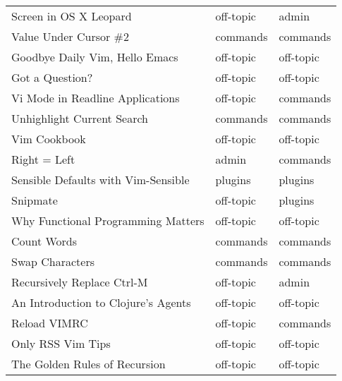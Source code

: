 \begin{tabular}{lll}
 Screen in OS X Leopard                      & off-topic   & admin     \\
 Value Under Cursor \#2                       & commands    & commands  \\
 Goodbye Daily Vim, Hello Emacs              & off-topic   & off-topic \\
 Got a Question?                             & off-topic   & off-topic \\
 Vi Mode in Readline Applications            & off-topic   & commands  \\
 Unhighlight Current Search                  & commands    & commands  \\
 Vim Cookbook                                & off-topic   & off-topic \\
 Right = Left                                & admin       & commands  \\
 Sensible Defaults with Vim-Sensible         & plugins     & plugins   \\
 Snipmate                                    & off-topic   & plugins   \\
 Why Functional Programming Matters          & off-topic   & off-topic \\
 Count Words                                 & commands    & commands  \\
 Swap Characters                             & commands    & commands  \\
 Recursively Replace Ctrl-M                  & off-topic   & admin     \\
 An Introduction to Clojure's Agents         & off-topic   & off-topic \\
 Reload VIMRC                                & off-topic   & commands  \\
 Only RSS Vim Tips                           & off-topic   & off-topic \\
 The Golden Rules of Recursion               & off-topic   & off-topic \\
\hline
\end{tabular}